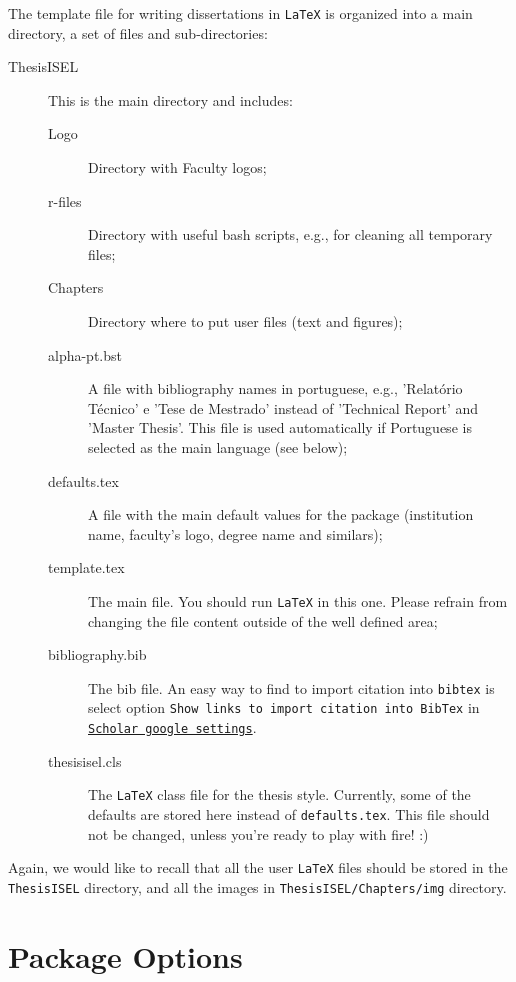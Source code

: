 The template file for writing dissertations in  \texttt{LaTeX} is organized into a main directory, a set of files and sub-directories:
\begin{description}
	\item[ThesisISEL] This is the main directory and includes:
	\begin{description}
		\item[Logo] Directory with Faculty logos;
		\item[r-files] Directory with useful bash scripts, e.g., for cleaning all temporary files;
		\item[Chapters] Directory where to put user files (text and figures);
		\item[alpha-pt.bst] A file with bibliography names in portuguese, e.g., 'Relatório Técnico' e 'Tese de Mestrado' instead of 'Technical Report' and 'Master Thesis'. This file is used automatically if Portuguese is selected as the main language (see below);
		\item[defaults.tex] A file with the main default values for the package (institution name, faculty's logo, degree name and similars);
		\item[template.tex] The main file. You should run  \texttt{LaTeX} in this one. Please refrain from changing the file content outside of the well defined area;
		\item[bibliography.bib] The bib file. An easy way to find to import citation into \texttt{bibtex} is select option \texttt{Show links to import citation into \texttt{BibTex}} in \href{http://scholar.google.pt/scholar_settings?hl=en&as_sdt=0,5}{\texttt{Scholar google settings}}.
		\item[thesisisel.cls] The  \texttt{LaTeX} class file for the thesis{} style. Currently, some of the defaults are stored here instead of \verb!defaults.tex!. This file should not be changed, unless you're ready to play with fire! :)
	\end{description}
\end{description}

Again, we would like to recall that all the user \texttt{LaTeX} files should be stored in the \verb!ThesisISEL! directory, and all the images in \verb!ThesisISEL/Chapters/img! directory.

\section{Package Options} %
\label{sec:package_options}

